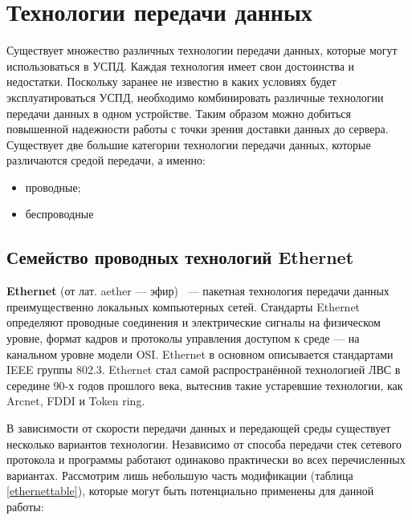 \section{Технологии передачи данных}

Существует множество различных технологии передачи данных, которые могут использоваться в УСПД. Каждая технология имеет свои достоинства и недостатки. Поскольку заранее не известно в каких условиях будет эксплуатироваться УСПД, необходимо комбинировать различные технологии передачи данных в одном устройстве. Таким образом можно добиться повышенной надежности работы с точки зрения доставки данных до сервера. Существует две большие категории технологии передачи данных, которые различаются средой передачи, а именно:
\begin{itemize}
\item проводные;
\item беспроводные
\end{itemize}

\subsection{Семейство проводных технологий Ethernet}

\textbf{Ethernet} (от лат. aether --- эфир) ~--- пакетная технология передачи данных преимущественно локальных компьютерных сетей. Стандарты Ethernet определяют проводные соединения и электрические сигналы на физическом уровне, формат кадров и протоколы управления доступом к среде — на канальном уровне модели OSI. Ethernet в основном описывается стандартами IEEE группы 802.3. Ethernet стал самой распространённой технологией ЛВС в середине 90-х годов прошлого века, вытеснив такие устаревшие технологии, как Arcnet, FDDI и Token ring\cite{ethernetinfo}.

В зависимости от скорости передачи данных и передающей среды существует несколько вариантов технологии. Независимо от способа передачи стек сетевого протокола и программы работают одинаково практически во всех перечисленных вариантах. Рассмотрим лишь небольшую часть модификации (таблица \ref{ethernettable}), которые могут быть потенциально применены для данной работы:

